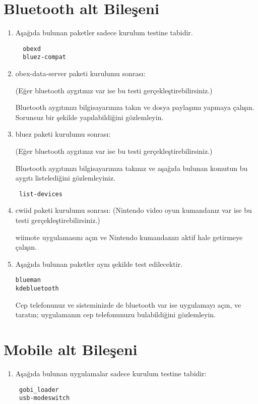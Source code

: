 \documentclass[a4paper,10pt]{article}
\begin{document}
\section{Bluetooth alt Bileşeni}
\begin{enumerate}
\item Aşağıda bulunan paketler sadece kurulum testine tabidir. 
\begin{verbatim}
  obexd
  bluez-compat
\end{verbatim}

 \item obex-data-server paketi kurulumu sonrası: 
 
(Eğer bluetooth aygıtınız var ise bu testi gerçekleştirebilirsiniz.)

Bluetooth aygıtınızı bilgisayarınıza takın ve dosya paylaşımı yapmaya çalışın. Sorunsuz bir şekilde yapılabildiğini gözlemleyin.
 \item bluez paketi kurulumu sonrası: 
 
(Eğer bluetooth aygıtınız var ise bu testi gerçekleştirebilirsiniz.)

Bluetooth aygıtınızı bilgisayarınıza takınız ve aşağıda bulunan komutun bu aygıtı listelediğini gözlemleyiniz.
\begin{verbatim}
 list-devices
\end{verbatim}

 \item cwiid paketi kurulumu sonrası: (Nintendo video oyun kumandanız var ise bu testi gerçekleştirebilirsiniz.)

wiimote uygulamasını açın ve Nintendo kumandanızı aktif hale getirmeye çalışın.

\item Aşağıda bulunan paketler aynı şekilde test edilecektir.
\begin{verbatim}
blueman
kdebluetooth 
\end{verbatim}

Cep telefonunuz ve sisteminizde de bluetooth var ise uygulamayı açın, ve taratın; uygulamanın cep telefonunuzu bulabildiğini gözlemleyin.
\end{enumerate}

\section{Mobile alt Bileşeni}
\begin{enumerate}
 \item Aşağıda bulunan uygulamalar sadece kurulum testine tabidir:
\begin{verbatim}
 gobi_loader
 usb-modeswitch
\end{verbatim}

\end{enumerate}
\end{document}
